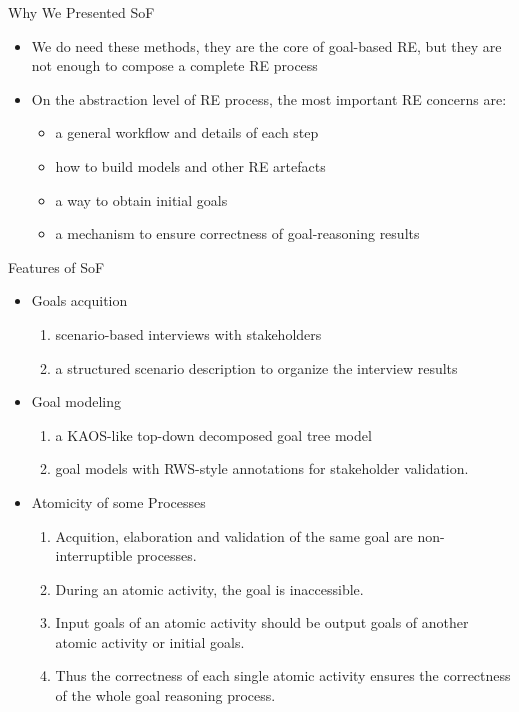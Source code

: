 \documentclass{beamer}
\begin{document}
\begin{frame}{Why We Presented SoF}          %
  \begin{itemize}
  \item We do need these methods, they are the core of goal-based RE, but they are not enough to compose a complete RE process
  \item 
    On the abstraction level of RE process, the most important RE concerns are: 
    \begin{itemize}
    \item a general workflow and details of each step 
    \item how to build models and other RE artefacts 
    \item a way to obtain initial goals 
    \item a mechanism to ensure correctness of goal-reasoning results 
    \end{itemize}
  \end{itemize}
\end{frame}

\begin{frame}{Features of SoF}             %
  \begin{itemize}
  \item Goals acquition 
    \begin{enumerate}
    \item scenario-based interviews with stakeholders 
    \item a structured scenario description to organize the interview results 
    \end{enumerate}
  \item Goal modeling  
    \begin{enumerate}
    \item a KAOS-like top-down decomposed goal tree model  
    \item goal models with RWS-style annotations for stakeholder validation. 
    \end{enumerate}
  \item Atomicity of some Processes 
    \begin{enumerate}
    \item Acquition, elaboration and validation of the same goal are non-interruptible processes. 
    \item During an atomic activity, the goal is inaccessible. 
    \item Input goals of an atomic activity should be output goals of another atomic activity or initial goals.
    \item Thus the correctness of each single atomic activity ensures the correctness of the whole goal reasoning process.
    \end{enumerate}
  \end{itemize}
\end{frame}
\end{document}
